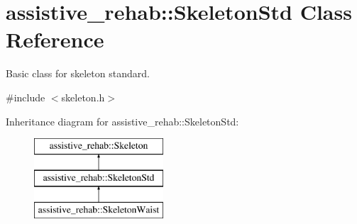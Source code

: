 \section{assistive\+\_\+rehab\+::Skeleton\+Std Class Reference}
\label{classassistive__rehab_1_1SkeletonStd}


Basic class for skeleton standard.  




{\ttfamily \#include $<$skeleton.\+h$>$}

Inheritance diagram for assistive\+\_\+rehab\+::Skeleton\+Std\+:\begin{figure}[H]
\begin{center}
\leavevmode
\includegraphics[height=3.000000cm]{classassistive__rehab_1_1SkeletonStd}
\end{center}
\end{figure}
